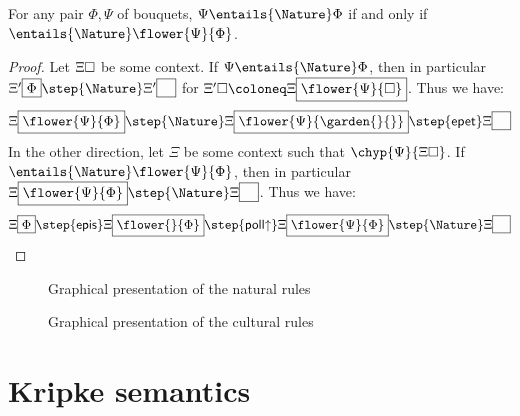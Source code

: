 \begin{theorem}[Deduction]
  For any pair $\Phi, \Psi$ of bouquets, $\Psi \entails{\Nature} \Phi$ if and only if
  $\entails{\Nature} \flower{\Psi}{\Phi}$.
\end{theorem}
\begin{proof}
  Let $\Xi\square$ be some context. If $\Psi \entails{\Nature} \Phi$, then in
  particular $\cfill{\Xi'}{\Phi} \step{\Nature} \cfill{\Xi'}{\phantom{\Phi}}$
  for $\Xi'\hole \deq \cfill{\Xi}{\flower{\Psi}{\square}}$. Thus we have:
  $$
  \cfill{\Xi}{\flower{\Psi}{\Phi}} \step{\Nature}
  \cfill{\Xi}{\flower{\Psi}{\garden{{}}{{}}}} \step{\mathsf{epet}}
  \cfill{\Xi}{\phantom{\Phi}}
  $$
  In the other direction, let $\Xi$ be some context such that
  $\chyp{\Psi}{\Xi\hole}$. If $\entails{\Nature}
  \flower{\Psi}{\Phi}$, then in particular
  $\cfill{\Xi}{\flower{\Psi}{\Phi}} \step{\Nature}
  \cfill{\Xi}{\phantom{\Phi}}$. Thus we have:
  $$
  \cfill{\Xi}{\Phi} \step{\mathsf{epis}}
  \cfill{\Xi}{\flower{{}}{\Phi}} \step{\mathsf{poll{\ua}}}
  \cfill{\Xi}{\flower{\Psi}{\Phi}} \step{\Nature}
  \cfill{\Xi}{\phantom{\Phi}}
  $$
\end{proof}

\begin{figure*}[h!]
  
  \caption{Graphical presentation of the natural rules}
\end{figure*}

\begin{figure*}[h!]
  
  \caption{Graphical presentation of the cultural rules}
\end{figure*}

\section{Kripke semantics}

